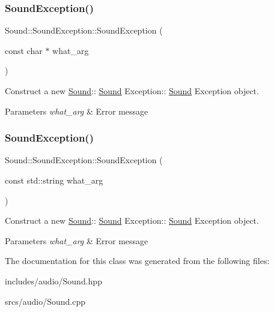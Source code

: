 \subsubsection{\texorpdfstring{Sound\+Exception()}{SoundException()}\hspace{0.1cm}{\footnotesize\ttfamily [1/2]}}
{\footnotesize\ttfamily Sound\+::\+Sound\+Exception\+::\+Sound\+Exception (\begin{DoxyParamCaption}\item[{const char $\ast$}]{what\+\_\+arg }\end{DoxyParamCaption})\hspace{0.3cm}{\ttfamily [explicit]}}



Construct a new \hyperlink{class_sound}{Sound}\+:\+: \hyperlink{class_sound}{Sound} Exception\+:\+: \hyperlink{class_sound}{Sound} Exception object. 


\begin{DoxyParams}{Parameters}
{\em what\+\_\+arg} & Error message \\
\hline
\end{DoxyParams}
\mbox{\label{class_sound_1_1_sound_exception_ad587317200c7d021303a588cff844473}} 
\subsubsection{\texorpdfstring{Sound\+Exception()}{SoundException()}\hspace{0.1cm}{\footnotesize\ttfamily [2/2]}}
{\footnotesize\ttfamily Sound\+::\+Sound\+Exception\+::\+Sound\+Exception (\begin{DoxyParamCaption}\item[{const std\+::string}]{what\+\_\+arg }\end{DoxyParamCaption})\hspace{0.3cm}{\ttfamily [explicit]}}



Construct a new \hyperlink{class_sound}{Sound}\+:\+: \hyperlink{class_sound}{Sound} Exception\+:\+: \hyperlink{class_sound}{Sound} Exception object. 


\begin{DoxyParams}{Parameters}
{\em what\+\_\+arg} & Error message \\
\hline
\end{DoxyParams}


The documentation for this class was generated from the following files\+:\begin{DoxyCompactItemize}
\item 
includes/audio/Sound.\+hpp\item 
srcs/audio/Sound.\+cpp\end{DoxyCompactItemize}
